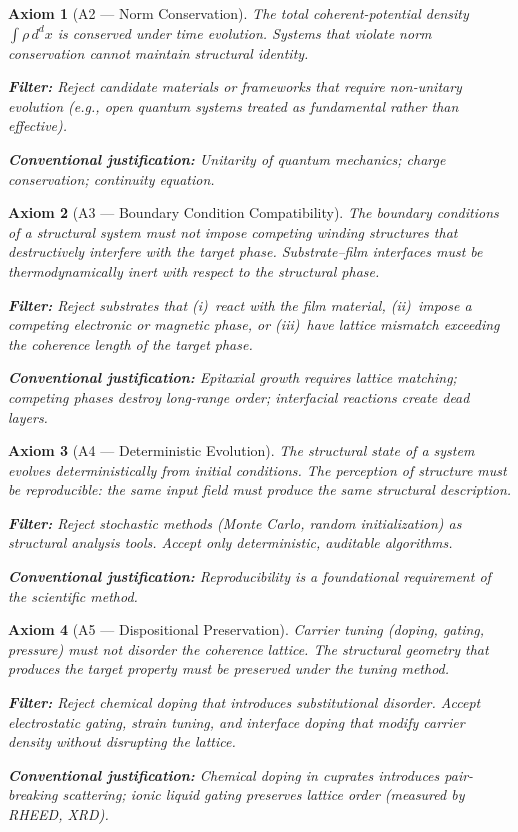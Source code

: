 \documentclass[11pt, a4paper]{article}
\newtheorem{axiom}{Axiom}[section]
\begin{document}
\begin{axiom}[A2 --- Norm Conservation]
\label{ax:a2}
The total coherent-potential density $\int \rho\, d^dx$ is
conserved under time evolution. Systems that violate norm
conservation cannot maintain structural identity.

\textbf{Filter:} Reject candidate materials or frameworks that
require non-unitary evolution (e.g., open quantum systems treated
as fundamental rather than effective).

\textbf{Conventional justification:} Unitarity of quantum
mechanics; charge conservation; continuity equation.
\end{axiom}

\begin{axiom}[A3 --- Boundary Condition Compatibility]
\label{ax:a3}
The boundary conditions of a structural system must not impose
competing winding structures that destructively interfere with
the target phase. Substrate--film interfaces must be
thermodynamically inert with respect to the structural phase.

\textbf{Filter:} Reject substrates that (i)~react with the
film material, (ii)~impose a competing electronic or magnetic
phase, or (iii)~have lattice mismatch exceeding the coherence
length of the target phase.

\textbf{Conventional justification:} Epitaxial growth requires
lattice matching; competing phases destroy long-range order;
interfacial reactions create dead layers.
\end{axiom}

\begin{axiom}[A4 --- Deterministic Evolution]
\label{ax:a4}
The structural state of a system evolves deterministically from
initial conditions. The perception of structure must be
reproducible: the same input field must produce the same
structural description.

\textbf{Filter:} Reject stochastic methods (Monte Carlo,
random initialization) as structural analysis tools. Accept
only deterministic, auditable algorithms.

\textbf{Conventional justification:} Reproducibility is
a foundational requirement of the scientific method.
\end{axiom}

\begin{axiom}[A5 --- Dispositional Preservation]
\label{ax:a5}
Carrier tuning (doping, gating, pressure) must not disorder
the coherence lattice. The structural geometry that produces
the target property must be preserved under the tuning method.

\textbf{Filter:} Reject chemical doping that introduces
substitutional disorder. Accept electrostatic gating, strain
tuning, and interface doping that modify carrier density
without disrupting the lattice.

\textbf{Conventional justification:} Chemical doping in
cuprates introduces pair-breaking scattering; ionic liquid
gating preserves lattice order (measured by RHEED, XRD).
\end{axiom}
\end{document}
